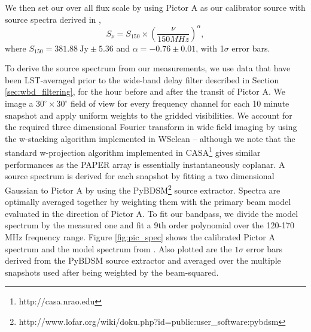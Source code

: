 \documentclass[twocolumn,numberedappendix]{emulateapj} \shorttitle{New Limits on the 21 cm Power Spectrum at $z=8.4$}
\begin{document}
We then set our over all flux scale by using Pictor A as our calibrator source
with source spectra derived in \citet{jacobs_et_al2013}, 
\begin{equation}
    S_{\nu} = S_{150}\times\left(\frac{\nu}{150MHz}\right)^{\alpha},
\end{equation}
where $S_{150} = 381.88~\text{Jy} \pm 5.36$ and $\alpha = -0.76 \pm 0.01$, with
1$\sigma$ error bars.



To derive the source spectrum from our measurements, we use data that have been
LST-averaged prior to the wide-band delay filter described in Section
\ref{sec:wbd_filtering}, for the hour before and after the transit of Pictor A.
We image a $30^\circ \times 30^\circ$ field of view for every frequency channel
for each 10 minute snapshot and apply uniform weights to the gridded
visibilities. We account for the required three dimensional Fourier transform in
wide field imaging by using the w-stacking algorithm implemented in WSclean
\citep{offringa_et_al2014} – although we note that the standard w-projection
algorithm implemented in CASA\footnote{http://casa.nrao.edu} gives similar
performances as the PAPER array is essentially instantaneously coplanar.  A
source spectrum is derived for each snapshot by fitting a two dimensional
Gaussian to Pictor A by using the
PyBDSM\footnote{http://www.lofar.org/wiki/doku.php?id=public:user\_software:pybdsm}
source extractor. Spectra are optimally averaged together by weighting them with
the primary beam model evaluated in the direction of Pictor A. To fit our
bandpass, we divide the model spectrum by the measured one and fit a 9th order
polynomial over the 120-170 MHz frequency range. Figure \ref{fig:pic_spec} shows
the calibrated Pictor A spectrum and the model spectrum from
\citet{jacobs_et_al2013}. Also plotted are the $1\sigma$ error bars derived from the PyBDSM source extractor and averaged over the multiple snapshots used after being weighted by the beam-squared.
\end{document}
